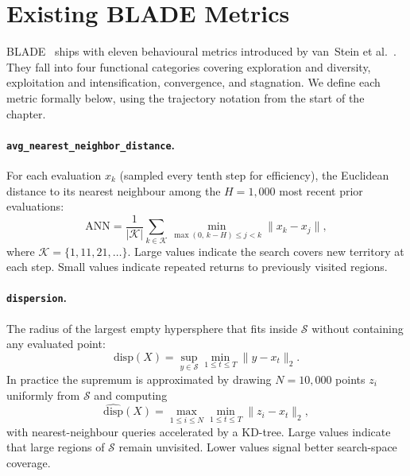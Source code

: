 \section{Existing BLADE Metrics}
\label{sec:features:blade}

BLADE~\cite{vanStein2025BLADE} ships with eleven behavioural metrics introduced by van~Stein et al.~\cite{vanStein2025Behaviour}. They fall into four functional categories covering exploration and diversity, exploitation and intensification, convergence, and stagnation. We define each metric formally below, using the trajectory notation from the start of the chapter.

\paragraph{\texttt{avg\_nearest\_neighbor\_distance}.}
For each evaluation $x_k$ (sampled every tenth step for efficiency), the Euclidean distance to its nearest neighbour among the $H = 1{,}000$ most recent prior evaluations:
\begin{equation}
\label{eq:avg_nn_dist}
  \text{ANN} = \frac{1}{|\mathcal{K}|} \sum_{k \in \mathcal{K}} \min_{\max(0,\, k-H) \le j < k} \lVert x_k - x_j \rVert,
\end{equation}
where $\mathcal{K} = \{1, 11, 21, \ldots\}$. Large values indicate the search covers new territory at each step. Small values indicate repeated returns to previously visited regions.

\paragraph{\texttt{dispersion}.}
The radius of the largest empty hypersphere that fits inside $\mathcal{S}$ without containing any evaluated point:
\begin{equation}
\label{eq:dispersion_formal}
  \mathrm{disp}(X) = \sup_{y \in \mathcal{S}} \min_{1 \le t \le T} \lVert y - x_t \rVert_2.
\end{equation}
In practice the supremum is approximated by drawing $N = 10{,}000$ points $z_i$ uniformly from $\mathcal{S}$ and computing
\begin{equation}
\label{eq:dispersion}
  \widehat{\mathrm{disp}}(X) = \max_{1 \le i \le N} \min_{1 \le t \le T} \lVert z_i - x_t \rVert_2,
\end{equation}
with nearest-neighbour queries accelerated by a KD-tree. Large values indicate that large regions of $\mathcal{S}$ remain unvisited. Lower values signal better search-space coverage.

